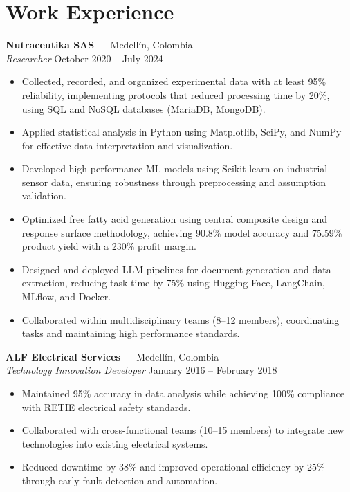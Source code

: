 \documentclass[10pt,a4paper]{article}
\begin{document}
\section*{Work Experience}

\textbf{Nutraceutika SAS} — Medellín, Colombia \\
\textit{Researcher} \hfill October 2020 -- July 2024
\begin{itemize}
    \item Collected, recorded, and organized experimental data with at least 95\% reliability, implementing protocols that reduced processing time by 20\%, using SQL and NoSQL databases (MariaDB, MongoDB).
    \item Applied statistical analysis in Python using Matplotlib, SciPy, and NumPy for effective data interpretation and visualization.
    \item Developed high-performance ML models using Scikit-learn on industrial sensor data, ensuring robustness through preprocessing and assumption validation.
    \item Optimized free fatty acid generation using central composite design and response surface methodology, achieving 90.8\% model accuracy and 75.59\% product yield with a 230\% profit margin.
    \item Designed and deployed LLM pipelines for document generation and data extraction, reducing task time by 75\% using Hugging Face, LangChain, MLflow, and Docker.
    \item Collaborated within multidisciplinary teams (8–12 members), coordinating tasks and maintaining high performance standards.
\end{itemize}

\textbf{ALF Electrical Services} — Medellín, Colombia \\
\textit{Technology Innovation Developer} \hfill January 2016 -- February 2018
\begin{itemize}
    \item Maintained 95\% accuracy in data analysis while achieving 100\% compliance with RETIE electrical safety standards.
    \item Collaborated with cross-functional teams (10–15 members) to integrate new technologies into existing electrical systems.
    \item Reduced downtime by 38\% and improved operational efficiency by 25\% through early fault detection and automation.
\end{itemize}
\vspace{-10pt}
\end{document}
